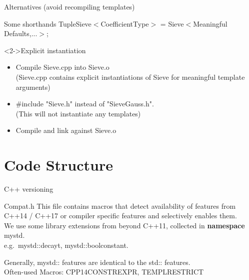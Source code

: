 \documentclass{beamer}
\begin{document}
\begin{frame}{Alternatives (avoid recompiling templates)}
\begin{block}{Some shorthands}
TupleSieve$<$CoefficientType$>$ = Sieve$<$Meaningful Defaults,...$>$;
\end{block}

\begin{block}<2->{Explicit instantiation}
\begin{itemize}
 \item<2-> Compile Sieve.cpp into Sieve.o\\
 (Sieve.cpp contains explicit instantiations of Sieve for meaningful template arguments)
 \item<3-> $\#$include "Sieve.h" instead of "SieveGauss.h".\\
 (This will not instantiate any templates)
 \item<4-> Compile and link against Sieve.o
\end{itemize}
\end{block}
\end{frame}


\section{Code Structure}


\begin{frame}{C++ versioning}
\begin{block}{Compat.h}
This file contains macros that detect availability of features from C++14 / C++17 or compiler specific features and selectively enables them.\\[2ex]
We use some library extensions from beyond C++11, collected in \textbf{namespace} mystd.\\
e.g.\ mystd::decay\textunderscore t, mystd::bool\textunderscore constant.

\vspace{2ex}

Generally, mystd:: features are identical to the std:: features.\\
Often-used Macros: CPP14CONSTREXPR, TEMPL\textunderscore RESTRICT\textunderscore * 
\end{block}
\end{frame}
\end{document}
